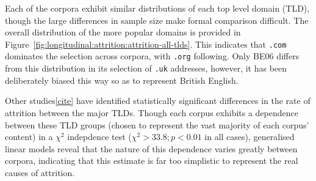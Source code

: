 Each of the corpora exhibit similar distributions of each top level domain (TLD), though the large differences in sample size make formal comparison difficult.  The overall distribution of the more popular domains is provided in Figure~\ref{fig:longitudinal:attrition:attrition-all-tlds}.  This indicates that \texttt{.com} dominates the selection across corpora, with \texttt{.org} following.  Only BE06 differs from this distribution in its selection of \texttt{.uk} addresses, however, it has been deliberately biased this way so as to represent British English.


Other studies\ref{cite} have identified statistically significant differences in the rate of attrition between the major TLDs.  
Though each corpus exhibits a dependence between these TLD groups (chosen to represent the vast majority of each corpus' content) in a $\chi^2$ indepdence test ($\chi^2 > 33.8; p<0.01$ in all cases), generalised linear models reveal that the nature of this dependence varies greatly between corpora, indicating that this estimate is far too simplistic to represent the real causes of attrition.






















